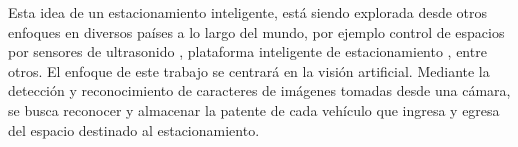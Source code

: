 Esta idea de un estacionamiento inteligente, está siendo explorada desde otros enfoques en diversos países a lo largo del mundo, por ejemplo control de espacios por sensores de ultrasonido \cite{rivera_arroyave_smartparkudea_2021}, plataforma inteligente de estacionamiento \cite{formoso_parkit_2014}, entre otros.
El enfoque de este trabajo se centrará en la visión artificial.
Mediante la detección y reconocimiento de caracteres de imágenes tomadas desde una cámara, se busca reconocer y almacenar la patente de cada vehículo que ingresa y egresa del espacio destinado al estacionamiento.
